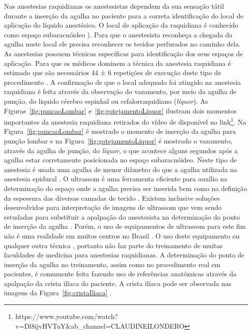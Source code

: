 Nas anestesias raquidianas os anestesistas dependem da sua sensação tátil durante a inserção da agulha no paciente para a correta identificação do local de aplicação do líquido anestésico. O local de aplicação da raquidiana é conhecido como espaço subaracnóideo \cite{Miller2009}). Para que o anestesista reconheça a chegada da agulha neste local ele precisa reconhecer os tecidos perfurados no caminho dela. As anestesias possuem técnicas específicas para identificação dos seus espaços de aplicação. Para que os médicos dominem a técnica da anestesia raquidiana é estimado que são necessários 44 ± 6 repetições de execução deste tipo de procedimento \cite{Kopacz1996}. A confirmação de que o local adequado foi atingido na anestesia raquidiana é feita através da observação do vazamento, por meio da agulha de punção, do liquido cérebro espinhal ou cefalorraquidiano (\textit{líquor}). As Figuras~\ref{fig:puncaoLombar} e~\ref{fig:gotejamentoLiquor} ilustram dois momentos importantes da anestesia raquidiana retirados do vídeo de \textcite{Londero2018} disponível no link\footnote{https://www.youtube.com/watch?v=Dl8ijvHVTuY&ab_channel=CLAUDINEILONDERO}. Na Figura~\ref{fig:puncaoLombar} é mostrado o momento de inserção da agulha para punção lombar e na Figura~\ref{fig:gotejamentoLiquor} é mostrado o vazamento, através da agulha de punção, do \textit{líquor}, o que acontece alguns segundos após a agulha estar corretamente posicionada no espaço subaracnóideo. Neste tipo de anestesia é usada uma agulha de menor diâmetro do que a agulha utilizada na anestesia epidural \cite{Miller2009}. O ultrassom é uma ferramenta eficiente para auxílio na determinação do espaço onde a agulha precisa ser inserida \cite{Helayel2010, Soni2019} bem como na definição da espessura das diversas camadas de tecido \cite{Klingensmith2022}. Existem inclusive soluções desenvolvidas para interpretação de imagens de ultrassom que vem sendo estudadas para substituir a apalpação do anestesista na determinação do ponto de inserção da agulha \cite{Ni2021}. Porém, o uso de equipamentos de ultrassom para este fim não é uma realidade em muitos centros no Brasil \cite{Hamaji2016}. O uso deste equipamento ou qualquer outra técnica \cite{Berde2022}, portanto não faz parte do treinamento de muitas faculdades de medicina para anestesias raquidianas. A determinação do ponto de inserção da agulha no treinamento, assim como no procedimento real em pacientes, é comumente feita fazendo uso de referências anatômicas através da apalpação da crista ilíaca do paciente. A crista ilíaca pode ser observada nas imagens da Figura~\ref{fig:cristaIliaca} \cite{Moura2019}. 

